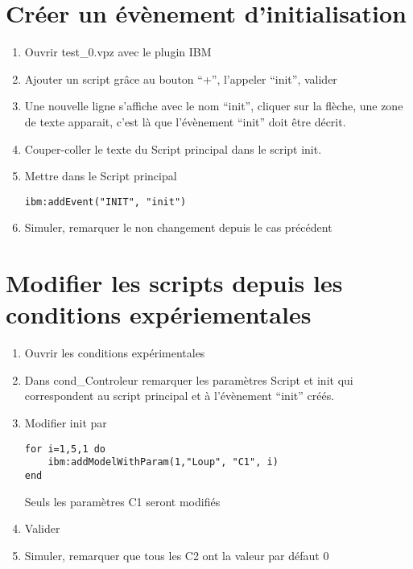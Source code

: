 \documentclass[a4paper,11pt,final]{article}
\begin{document}
\section{Créer un évènement d'initialisation}
\begin{enumerate}
	\item Ouvrir test\_0.vpz avec le plugin IBM
	\item Ajouter un script grâce au bouton ``+'', l'appeler ``init'', valider
	\item Une nouvelle ligne s'affiche avec le nom ``init'', cliquer sur la flèche, une zone de texte apparait, c'est là que l'évènement ``init'' doit être décrit.
	\item Couper-coller le texte du Script principal dans le script init.
	\item Mettre dans le Script principal
	\begin{lstlisting}[frame=single]
ibm:addEvent("INIT", "init")
\end{lstlisting} 
	\item Simuler, remarquer le non changement depuis le cas précédent
\end{enumerate}

\section{Modifier les scripts depuis les conditions expériementales}
\begin{enumerate}
	\item Ouvrir les conditions expérimentales
	\item Dans cond\_Controleur remarquer les paramètres Script et init qui correspondent au script principal et à l'évènement ``init'' créés.
	\item Modifier init par
	\begin{lstlisting}[frame=single]
for i=1,5,1 do
	ibm:addModelWithParam(1,"Loup", "C1", i)
end
	\end{lstlisting}  

	Seuls les paramètres C1 seront modifiés
	\item Valider
	\item Simuler, remarquer que tous les C2 ont la valeur par défaut 0
\end{enumerate}
\end{document}
